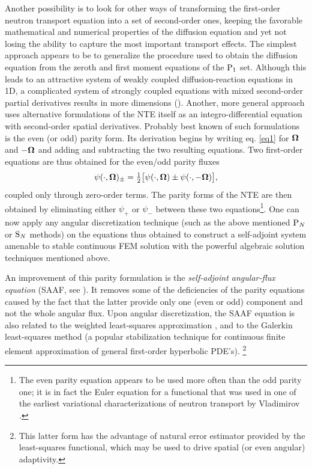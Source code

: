Another possibility is to look for other ways of transforming the first-order neutron transport equation into a set of
second-order ones, keeping the favorable mathematical and numerical properties of the diffusion equation and yet not
losing the ability to capture the most important transport effects. The simplest approach appears to be to generalize
the procedure used to obtain the diffusion equation from the zeroth and first moment equations of the $\PN[1]$ set.
Although this leads to an attractive system of weakly coupled diffusion-reaction equations in 1D, a complicated system
of strongly coupled equations with mixed second-order partial derivatives results in more dimensions (\cite{Capilla}).
Another, more general approach uses alternative formulations of the NTE itself as an integro-differential equation with
second-order spatial derivatives. Probably best known of such formulations is the even (or odd) parity form. Its
derivation begins by writing eq. \eqref{eq1} for $\bomega$ and $-\bomega$ and adding and subtracting the two resulting
equations. Two first-order equations are thus obtained for the even/odd parity fluxes  
$$
\psi(\cdot,\bomega)_{\pm} =
\tfrac12\bigl[\psi(\cdot,\bomega) \pm \psi(\cdot,-\bomega)\bigr],$$ 
coupled only through zero-order terms. The parity
forms of the NTE are then obtained by eliminating either $\psi_+$ or $\psi_-$ between these two equations\footnote{The
even parity equation appears to be used more often than the odd parity one; it is in fact the Euler equation for a
functional that was used in one of the earliest variational characterizations of neutron transport by Vladimirov
\cite{Vladimirov}.}.
One can now apply any angular discretization technique (such as the above mentioned $\PN$ or $\SN$ methods) on the 
equations thus obtained to construct a self-adjoint system amenable to stable continuous FEM solution with the powerful
algebraic solution techniques mentioned above.

An improvement of this parity formulation is the \textit{self-adjoint angular-flux equation} (SAAF, see \cite{Morel1}).
It removes some of the deficiencies of the parity equations caused by the fact that the latter provide only one (even or
odd) component and not the whole angular flux. Upon angular discretization, the SAAF equation is also related to the
weighted least-squares approximation \cite{Manteuffel}, and to the Galerkin least-squares method (a popular
stabilization technique for continuous finite element approximation of general first-order hyperbolic PDE's). \footnote{This latter form has the
advantage of natural error estimator provided by the least-squares functional, which may be used to drive spatial (or even angular)
adaptivity.}

